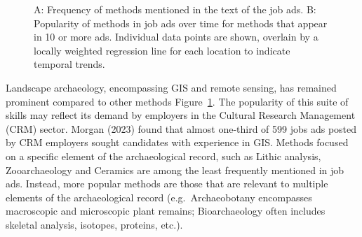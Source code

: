 \documentclass[
  12pt,
]{article}
\begin{document}
\begin{figure}


\caption{\label{fig-show-metho-trends}A: Frequency of methods mentioned
in the text of the job ads. B: Popularity of methods in job ads over
time for methods that appear in 10 or more ads. Individual data points
are shown, overlain by a locally weighted regression line for each
location to indicate temporal trends.}

\end{figure}%

Landscape archaeology, encompassing GIS and remote sensing, has remained
prominent compared to other methods Figure~\ref{fig-show-metho-trends}.
The popularity of this suite of skills may reflect its demand by
employers in the Cultural Research Management (CRM) sector. Morgan
(2023) found that almost one-third of 599 jobs ads posted by CRM
employers sought candidates with experience in GIS. Methods focused on a
specific element of the archaeological record, such as Lithic analysis,
Zooarchaeology and Ceramics are among the least frequently mentioned in
job ads. Instead, more popular methods are those that are relevant to
multiple elements of the archaeological record (e.g.~Archaeobotany
encompasses macroscopic and microscopic plant remains; Bioarchaeology
often includes skeletal analysis, isotopes, proteins, etc.).
\end{document}
